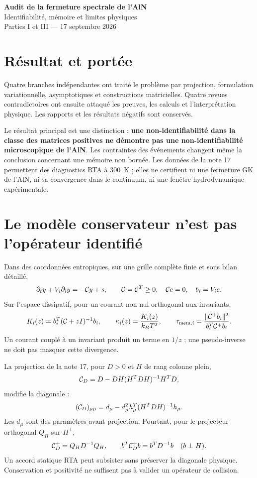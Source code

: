 \documentclass[11pt,a4paper]{article}
\begin{document}
\begin{center}
{\Large\bfseries Audit de la fermeture spectrale de l'AlN}\\[4pt]
{\normalsize Identifiabilité, mémoire et limites physiques}\\[2pt]
{\small Parties I et III --- 17 septembre 2026}
\end{center}
\section{Résultat et portée}
Quatre branches indépendantes ont traité le problème par projection, formulation variationnelle, asymptotiques et constructions matricielles. Quatre revues contradictoires ont ensuite attaqué les preuves, les calculs et l'interprétation physique. Les rapports et les résultats négatifs sont conservés.

Le résultat principal est une distinction : \textbf{une non-identifiabilité dans la classe des matrices positives ne démontre pas une non-identifiabilité microscopique de l'AlN}. Les contraintes des événements changent même la conclusion concernant une mémoire non bornée. Les données de la note 17 permettent des diagnostics RTA à 300~K ; elles ne certifient ni une fermeture GK de l'AlN, ni sa convergence dans le continuum, ni une fenêtre hydrodynamique expérimentale.

\section{Le modèle conservateur n'est pas l'opérateur identifié}
Dans des coordonnées entropiques, sur une grille complète finie et sous bilan détaillé,
\[
 \partial_t y+V_i\partial_i y=-{\cal C}y+s,\qquad
 {\cal C}={\cal C}^T\ge0,\quad {\cal C}e=0,\quad b_i=V_i e .
\]
Sur l'espace dissipatif, pour un courant non nul orthogonal aux invariants,
\[
 K_i(z)=b_i^T({\cal C}+zI)^{-1}b_i,\qquad
 \kappa_i(z)=\frac{K_i(z)}{k_BT^2},\qquad
 \tau_{{\rm mem},i}=\frac{\|{\cal C}^{+}b_i\|^2}{b_i^T{\cal C}^{+}b_i}.
\]
Un courant couplé à un invariant produit un terme en $1/z$ ; une pseudo-inverse ne doit pas masquer cette divergence.

La projection de la note 17, pour $D>0$ et $H$ de rang colonne plein,
\[
 {\cal C}_D=D-DH(H^TDH)^{-1}H^TD,
\]
modifie la diagonale :
\[
 ({\cal C}_D)_{\mu\mu}
 =d_\mu-d_\mu^2h_\mu^T(H^TDH)^{-1}h_\mu .
\]
Les $d_\mu$ sont des paramètres avant projection. Pourtant, pour le projecteur orthogonal $Q_H$ sur $H^\perp$,
\[
 {\cal C}_D^+=Q_HD^{-1}Q_H,\qquad
 b^T{\cal C}_D^+b=b^TD^{-1}b\quad(b\perp H).
\]
Un accord statique RTA peut subsister sans préserver la diagonale physique. Conservation et positivité ne suffisent pas à valider un opérateur de collision.
\end{document}
